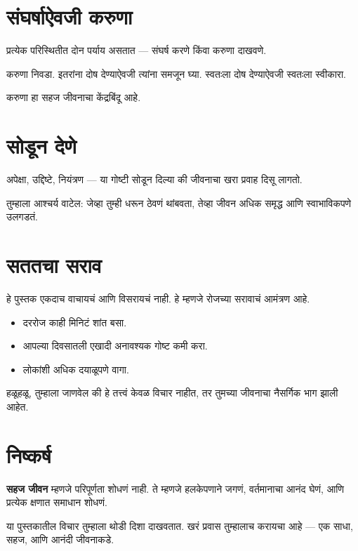 \section*{संघर्षाऐवजी करुणा}

प्रत्येक परिस्थितीत दोन पर्याय असतात —  
संघर्ष करणे किंवा करुणा दाखवणे.  

करुणा निवडा.  
इतरांना दोष देण्याऐवजी त्यांना समजून घ्या.  
स्वतःला दोष देण्याऐवजी स्वतःला स्वीकारा.  

करुणा हा सहज जीवनाचा केंद्रबिंदू आहे.  



\section*{सोडून देणे}

अपेक्षा, उद्दिष्टे, नियंत्रण —  
या गोष्टी सोडून दिल्या की जीवनाचा खरा प्रवाह दिसू लागतो.  

तुम्हाला आश्चर्य वाटेल:  
जेव्हा तुम्ही धरून ठेवणं थांबवता,  
तेव्हा जीवन अधिक समृद्ध आणि स्वाभाविकपणे उलगडतं.  



\section*{सततचा सराव}

हे पुस्तक एकदाच वाचायचं आणि विसरायचं नाही.  
हे म्हणजे रोजच्या सरावाचं आमंत्रण आहे.  

\begin{itemize}
  \item दररोज काही मिनिटं शांत बसा.  
  \item आपल्या दिवसातली एखादी अनावश्यक गोष्ट कमी करा.  
  \item लोकांशी अधिक दयाळूपणे वागा.  
\end{itemize}

हळूहळू, तुम्हाला जाणवेल की हे तत्त्वं केवळ विचार नाहीत,  
तर तुमच्या जीवनाचा नैसर्गिक भाग झाली आहेत.  



\section*{निष्कर्ष}

\textbf{सहज जीवन} म्हणजे परिपूर्णता शोधणं नाही.  
ते म्हणजे हलकेपणाने जगणं, वर्तमानाचा आनंद घेणं,  
आणि प्रत्येक क्षणात समाधान शोधणं.  

या पुस्तकातील विचार तुम्हाला थोडी दिशा दाखवतात.  
खरं प्रवास तुम्हालाच करायचा आहे —  
एक साधा, सहज, आणि आनंदी जीवनाकडे.  
